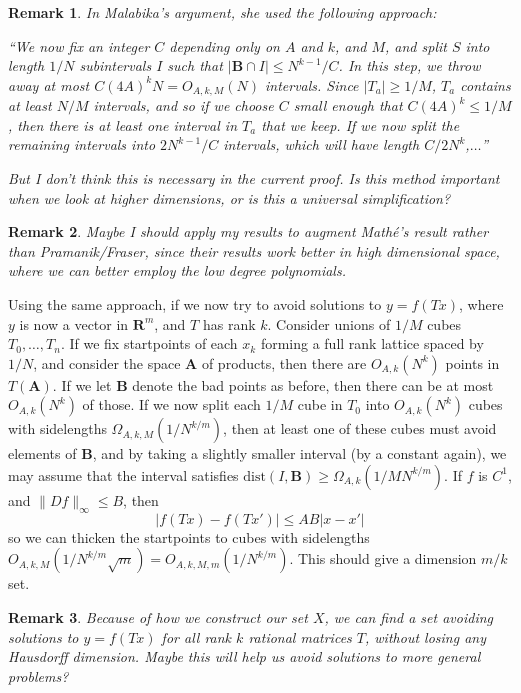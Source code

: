 \documentclass{report}
\theoremstyle{plain}
\theoremstyle{plain}
\newtheorem*{remark}{Remark}
\begin{document}
\begin{remark}
    In Malabika's argument, she used the following approach:
    
    ``We now fix an integer $C$ depending only on $A$ and $k$, and $M$, and split $S$ into length $1/N$ subintervals $I$ such that $|\mathbf{B} \cap I| \leq N^{k-1}/C$. In this step, we throw away at most $C(4A)^k N = O_{A,k,M}(N)$ intervals. Since $|T_a| \geq 1/M$, $T_a$ contains at least $N/M$ intervals, and so if we choose $C$ small enough that $C(4A)^k \leq 1/M$, then there is at least one interval in $T_a$ that we keep. If we now split the remaining intervals into $2N^{k-1}/C$ intervals, which will have length $C/2N^k$,$\dots$''

    But I don't think this is necessary in the current proof. Is this method important when we look at higher dimensions, or is this a universal simplification?
\end{remark}

\begin{remark}
    Maybe I should apply my results to augment Math\'{e}'s result rather than Pramanik/Fraser, since their results work better in high dimensional space, where we can better employ the low degree polynomials.
\end{remark}

Using the same approach, if we now try to avoid solutions to $y = f(Tx)$, where $y$ is now a vector in $\mathbf{R}^m$, and $T$ has rank $k$. Consider unions of $1/M$ cubes $T_0, \dots, T_n$. If we fix startpoints of each $x_k$ forming a full rank lattice spaced by $1/N$, and consider the space $\mathbf{A}$ of products, then there are $O_{A,k}(N^k)$ points in $T(\mathbf{A})$. If we let $\mathbf{B}$ denote the bad points as before, then there can be at most $O_{A,k}(N^k)$ of those. If we now split each $1/M$ cube in $T_0$ into $O_{A,k}(N^k)$ cubes with sidelengths $\Omega_{A,k,M}(1/N^{k/m})$, then at least one of these cubes must avoid elements of $\mathbf{B}$, and by taking a slightly smaller interval (by a constant again), we may assume that the interval satisfies $\text{dist}(I,\mathbf{B}) \geq \Omega_{A,k}(1/MN^{k/m})$. If $f$ is $C^1$, and $\| Df \|_\infty \leq B$, then
%
\[ |f(Tx) - f(Tx')| \leq AB|x - x'| \]
%
so we can thicken the startpoints to cubes with sidelengths $O_{A,k,M}(1/N^{k/m}\sqrt{m}) = O_{A,k,M,m}(1/N^{k/m})$. This should give a dimension $m/k$ set.

\begin{remark}
    Because of how we construct our set $X$, we can find a set avoiding solutions to $y = f(Tx)$ for {\it all} rank $k$ rational matrices $T$, without losing any Hausdorff dimension. Maybe this will help us avoid solutions to more general problems?
\end{remark}
\end{document}
